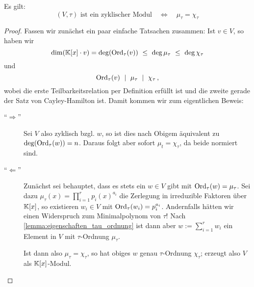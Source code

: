 \begin{satz}
  Es gilt:
  \[ (V,\tau) \text{ ist ein zyklischer Modul} \quad\Leftrightarrow\quad
    \mu_\tau = \chi_\tau\]
\end{satz}
\begin{proof}
  Fassen wir zunächst ein paar einfache Tatsachen zusammen:
  Ist $v \in V$, so haben wir 
  \[ \dim(\mathbb{K}[x]\cdot v) = \deg( \operatorname{Ord}_\tau(v) ) \ \leq\  
    \deg\mu_\tau \ \leq\  \deg \chi_\tau \]
  und 
  \[ \operatorname{Ord}_\tau (v) \ \mid\  \mu_\tau \ \mid\  \chi_\tau \,,\]
  wobei die erste Teilbarkeitsrelation per Definition erfüllt ist und die
  zweite gerade der Satz von Cayley-Hamilton ist.
  Damit kommen wir zum eigentlichen Beweis:
  \begin{description}
    \item["`$\Rightarrow$"'] Sei $V$ also zyklisch bzgl. $w$, so ist dies nach
      Obigem äquivalent zu $\deg(\operatorname{Ord}_\tau(w)) = n$. Daraus folgt aber sofort
      $\mu_t = \chi_\tau$, da beide normiert sind.
    \item["`$\Leftarrow$"'] Zunächst sei behauptet, dass es stets ein 
      $w \in V$ gibt mit $\operatorname{Ord}_\tau(w) = \mu_\tau$. Sei dazu 
      $\mu_\tau(x) = \prod_{i=1}^r p_i(x)^{a_i}$ die Zerlegung in irreduzible
      Faktoren über $\mathbb{K}[x]$, so existieren $w_i \in V$ mit
      $\operatorname{Ord}_\tau(w_i) = p_i^{a_i}$. Andernfalls hätten wir einen Widerspruch 
      zum Minimalpolynom von $\tau$!
      Nach \autoref{lemma:eigenschaften_tau_ordnung} ist dann aber 
      $w := \sum_{i=1}^r w_i$ ein Element in $V$ mit $\tau$-Ordnung $\mu_\tau$.

      Ist dann also $\mu_\tau = \chi_\tau$, so hat obiges $w$ genau
      $\tau$-Ordnung $\chi_\tau$; erzeugt also $V$ als $\mathbb{K}[x]$-Modul.
  \end{description}
\end{proof}


